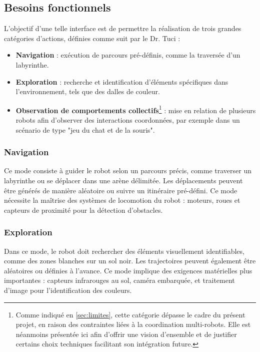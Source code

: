 \subsection{Besoins fonctionnels} \label{sec:specs}

L’objectif d'une telle interface est de permettre la réalisation de trois grandes catégories d’actions, définies comme suit par le Dr. Tuci :  

\begin{itemize}
    \item \textbf{Navigation} : exécution de parcours pré-définis, comme la traversée d’un labyrinthe.
    
    \item \textbf{Exploration} : recherche et identification d’éléments spécifiques dans l’environnement, tels que des dalles de couleur.
    
    \item \textbf{Observation de comportements collectifs}\footnote{Comme indiqué en \autoref{sec:limites}, cette catégorie dépasse le cadre du présent projet, en raison des contraintes liées à la coordination multi-robots. Elle est néanmoins présentée ici afin d’offrir une vision d’ensemble et de justifier certains choix techniques facilitant son intégration future.} : mise en relation de plusieurs robots afin d’observer des interactions coordonnées, par exemple dans un scénario de type "jeu du chat et de la souris".
\end{itemize}

\subsubsection{Navigation}
Ce mode consiste à guider le robot selon un parcours précis, comme traverser un labyrinthe ou se déplacer dans une arène délimitée.
Les déplacements peuvent être générés de manière aléatoire ou suivre un itinéraire pré-défini.
Ce mode nécessite la maîtrise des systèmes de locomotion du robot : moteurs, roues et capteurs de proximité pour la détection d’obstacles.


\subsubsection{Exploration}
Dans ce mode, le robot doit rechercher des éléments visuellement identifiables, comme des zones blanches sur un sol noir.
Les trajectoires peuvent également être aléatoires ou définies à l’avance.
Ce mode implique des exigences matérielles plus importantes : capteurs infrarouges au sol, caméra embarquée, et traitement d’image pour l’identification des couleurs.


